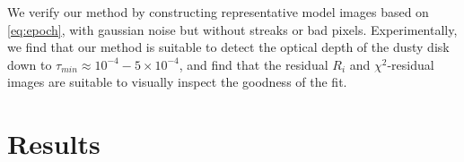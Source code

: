 \documentclass{aa}
\begin{document}

We verify our method by constructing representative model images based on \autoref{eq:epoch}, with gaussian noise but without streaks or bad pixels.
Experimentally, we find that our method is suitable to detect the optical depth of the dusty disk down to $\tau_{min}\approx 10^{-4} - 5 \times 10^{-4}$, and find that the residual $R_i$ and $\chi^{2}$-residual images are suitable to visually inspect the goodness of the fit.
\section{Results}
\label{sec:results}


\end{document}
